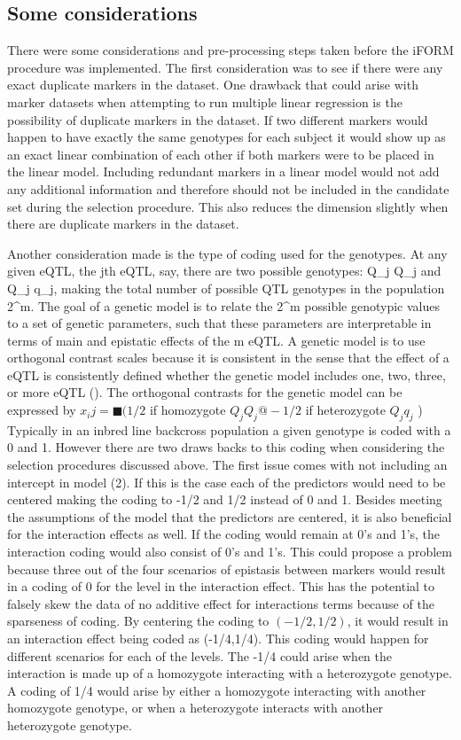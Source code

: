 \documentclass[11pt,]{book}
\theoremstyle{definition}
\theoremstyle{definition}
\theoremstyle{remark}
\begin{document}
\subsection{Some considerations}\label{some-considerations}

There were some considerations and pre-processing steps taken before the
iFORM procedure was implemented. The first consideration was to see if
there were any exact duplicate markers in the dataset. One drawback that
could arise with marker datasets when attempting to run multiple linear
regression is the possibility of duplicate markers in the dataset. If
two different markers would happen to have exactly the same genotypes
for each subject it would show up as an exact linear combination of each
other if both markers were to be placed in the linear model. Including
redundant markers in a linear model would not add any additional
information and therefore should not be included in the candidate set
during the selection procedure. This also reduces the dimension slightly
when there are duplicate markers in the dataset.

Another consideration made is the type of coding used for the genotypes.
At any given eQTL, the jth eQTL, say, there are two possible genotypes:
Q\_j Q\_j and Q\_j q\_j, making the total number of possible QTL
genotypes in the population 2\^{}m. The goal of a genetic model is to
relate the 2\^{}m possible genotypic values to a set of genetic
parameters, such that these parameters are interpretable in terms of
main and epistatic effects of the m eQTL. A genetic model is to use
orthogonal contrast scales because it is consistent in the sense that
the effect of a eQTL is consistently defined whether the genetic model
includes one, two, three, or more eQTL (\cite{kao2002modeling}). The
orthogonal contrasts for the genetic model can be expressed by
\(x_ij=■(1/2\) if homozygote \(Q_j Q_j@-1/2\) if heterozygote
\(Q_j q_j\) ) Typically in an inbred line backcross population a given
genotype is coded with a 0 and 1. However there are two draws backs to
this coding when considering the selection procedures discussed above.
The first issue comes with not including an intercept in model (2). If
this is the case each of the predictors would need to be centered making
the coding to -1/2 and 1/2 instead of 0 and 1. Besides meeting the
assumptions of the model that the predictors are centered, it is also
beneficial for the interaction effects as well. If the coding would
remain at 0's and 1's, the interaction coding would also consist of 0's
and 1's. This could propose a problem because three out of the four
scenarios of epistasis between markers would result in a coding of 0 for
the level in the interaction effect. This has the potential to falsely
skew the data of no additive effect for interactions terms because of
the sparseness of coding. By centering the coding to \((-1/2,1/2)\), it
would result in an interaction effect being coded as (-1/4,1/4). This
coding would happen for different scenarios for each of the levels. The
-1/4 could arise when the interaction is made up of a homozygote
interacting with a heterozygote genotype. A coding of 1/4 would arise by
either a homozygote interacting with another homozygote genotype, or
when a heterozygote interacts with another heterozygote genotype.
\end{document}
